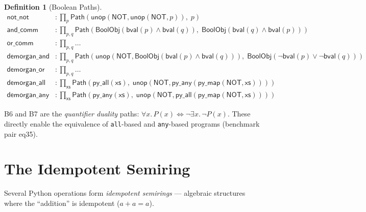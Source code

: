 \documentclass[11pt,a4paper]{report}
\theoremstyle{definition}
\newtheorem{definition}{Definition}[chapter]
\theoremstyle{plain}
\newcommand{\Path}{\mathsf{Path}}
\begin{document}
\begin{definition}[Boolean Paths]
\begin{align}
  \mathsf{not\_not} &: \prod_p
    \Path(\mathsf{unop}(\mathsf{NOT}, \mathsf{unop}(\mathsf{NOT}, p)),\; p)
    \tag{B1} \\
  \mathsf{and\_comm} &: \prod_{p,q}
    \Path(\mathsf{BoolObj}(\mathsf{bval}(p) \land \mathsf{bval}(q)),\;
          \mathsf{BoolObj}(\mathsf{bval}(q) \land \mathsf{bval}(p)))
    \tag{B2} \\
  \mathsf{or\_comm} &: \prod_{p,q} \ldots
    \tag{B3} \\
  \mathsf{demorgan\_and} &: \prod_{p,q}
    \Path(\mathsf{unop}(\mathsf{NOT},
      \mathsf{BoolObj}(\mathsf{bval}(p) \land \mathsf{bval}(q))),\;
      \mathsf{BoolObj}(\lnot\mathsf{bval}(p) \lor \lnot\mathsf{bval}(q)))
    \tag{B4} \\
  \mathsf{demorgan\_or} &: \prod_{p,q} \ldots
    \tag{B5} \\
  \mathsf{demorgan\_all} &: \prod_{\mathsf{xs}}
    \Path(\mathsf{py\_all}(\mathsf{xs}),\;
          \mathsf{unop}(\mathsf{NOT},
          \mathsf{py\_any}(\mathsf{py\_map}(\mathsf{NOT}, \mathsf{xs}))))
    \tag{B6} \\
  \mathsf{demorgan\_any} &: \prod_{\mathsf{xs}}
    \Path(\mathsf{py\_any}(\mathsf{xs}),\;
          \mathsf{unop}(\mathsf{NOT},
          \mathsf{py\_all}(\mathsf{py\_map}(\mathsf{NOT}, \mathsf{xs}))))
    \tag{B7}
\end{align}
\end{definition}

B6 and B7 are the \emph{quantifier duality} paths: $\forall x.\, P(x)
\iff \lnot\exists x.\, \lnot P(x)$.  These directly enable the
equivalence of \texttt{all}-based and \texttt{any}-based programs
(benchmark pair eq35).


\section{The Idempotent Semiring}

Several Python operations form \emph{idempotent semirings} --- algebraic
structures where the ``addition'' is idempotent ($a + a = a$).
\end{document}
